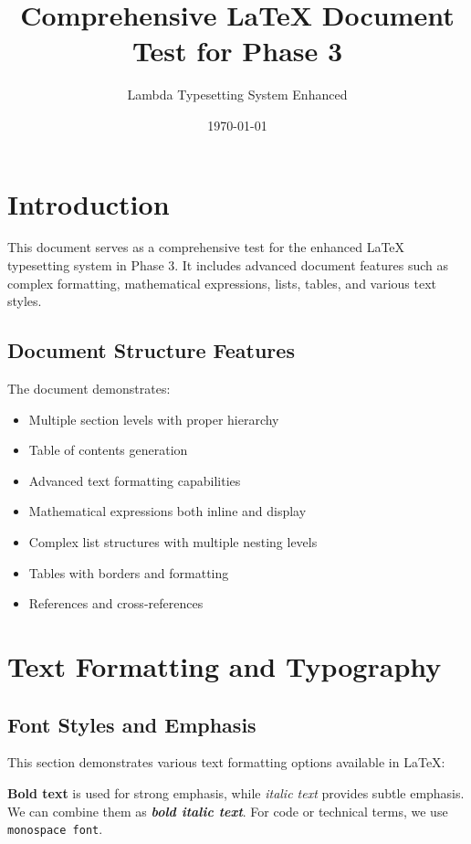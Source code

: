 \documentclass[11pt,letterpaper]{article}
\title{Comprehensive LaTeX Document Test for Phase 3}
\author{Lambda Typesetting System Enhanced}
\date{\today}
\begin{document}
\maketitle

\tableofcontents

\section{Introduction}

This document serves as a comprehensive test for the enhanced LaTeX typesetting system in Phase 3. It includes advanced document features such as complex formatting, mathematical expressions, lists, tables, and various text styles.

\subsection{Document Structure Features}

The document demonstrates:
\begin{itemize}
    \item Multiple section levels with proper hierarchy
    \item Table of contents generation
    \item Advanced text formatting capabilities
    \item Mathematical expressions both inline and display
    \item Complex list structures with multiple nesting levels
    \item Tables with borders and formatting
    \item References and cross-references
\end{itemize}

\section{Text Formatting and Typography}

\subsection{Font Styles and Emphasis}

This section demonstrates various text formatting options available in LaTeX:

\textbf{Bold text} is used for strong emphasis, while \textit{italic text} provides subtle emphasis. We can combine them as \textbf{\textit{bold italic text}}. For code or technical terms, we use \texttt{monospace font}.
\end{document}

